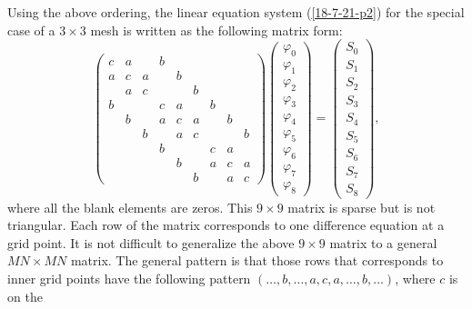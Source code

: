 \documentclass{article}
\begin{document}
Using the above ordering, the linear equation system (\ref{18-7-21-p2}) for
the special case of a $3 \times 3$ mesh is written as the following matrix
form:
\begin{equation}
  \left(\begin{array}{ccccccccc}
    c & a &  & b &  &  &  &  & \\
    a & c & a &  & b &  &  &  & \\
    & a & c &  &  & b &  &  & \\
    b &  &  & c & a &  & b &  & \\
    & b &  & a & c & a &  & b & \\
    &  & b &  & a & c &  &  & b\\
    &  &  & b &  &  & c & a & \\
    &  &  &  & b &  & a & c & a\\
    &  &  &  &  & b &  & a & c
  \end{array}\right) \left(\begin{array}{c}
    \varphi_0\\
    \varphi_1\\
    \varphi_2\\
    \varphi_3\\
    \varphi_4\\
    \varphi_5\\
    \varphi_6\\
    \varphi_7\\
    \varphi_8
  \end{array}\right) = \left(\begin{array}{c}
    S_0\\
    S_1\\
    S_2\\
    S_3\\
    S_4\\
    S_5\\
    S_6\\
    S_7\\
    S_8
  \end{array}\right),
\end{equation}
where all the blank elements are zeros. This $9 \times 9$ matrix is sparse but
is not triangular. Each row of the matrix corresponds to one difference
equation at a grid point. It is not difficult to generalize the above $9
\times 9$ matrix to a general $M N \times M N$ matrix. The general pattern is
that those rows that corresponds to inner grid points have the following
pattern $(\ldots, b, \ldots, a, c, a, \ldots, b, \ldots)$, where $c$ is on the
\end{document}
